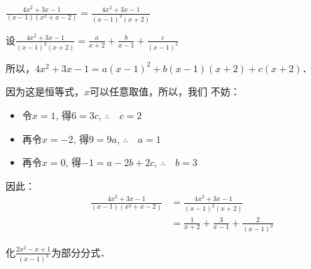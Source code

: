 \begin{solution}
$\frac{4x^2+3x-1}{(x-1)(x^2+x-2)}=\frac{4x^2+3x-1}{(x-1)^2(x+2)}$

设$\frac{4x^2+3x-1}{(x-1)^2(x+2)}=\frac{a}{x+2}+\frac{b}{x-1}+\frac{c}{(x-1)^2}$

所以，$4x^2+3x-1=a(x-1)^2+b(x-1)(x+2)+c(x+2)$．

因为这是恒等式，$x$可以任意取值，所以，我们
不妨：
\begin{itemize}
    \item 令$x=1$, 得$6=3c$, $\therefore\quad c=2$
    \item 再令$x=-2$, 得$9=9a$, $\therefore\quad a=1$
\item 再令$x=0$, 得$-1=a-2b+2c$, $\therefore\quad b=3$
\end{itemize}
因此：
\[\begin{split}
    \frac{4x^2+3x-1}{(x-1)(x^2+x-2)}&=\frac{4x^2+3x-1}{(x-1)^2(x+2)}\\
    &= \frac{1}{x+2}+\frac{3}{x-1}+\frac{2}{(x-1)^2}
\end{split}\]
\end{solution}

\begin{example}
    化$\frac{2x^2-x+1}{(x-1)^3}$为部分分式．
\end{example}

